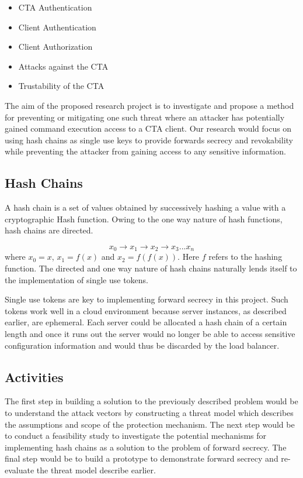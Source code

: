 \documentclass[10pt,conference]{IEEEtran}
\begin{document}
\begin{itemize}
\item CTA Authentication 
\item Client Authentication
\item Client Authorization
\item Attacks against the CTA
\item Trustability of the CTA
\end{itemize}

The aim of the proposed research project is to investigate and propose a method for preventing or 
mitigating one such threat where an attacker has potentially gained command execution access to a 
CTA client. Our research would focus on using hash chains as single use keys to provide 
forwards secrecy\cite{conti_ripp-fs:_2007} and revokability while preventing the attacker from 
gaining access to any sensitive information.

\subsection{Hash Chains}

A hash chain is a set of values obtained by successively hashing a value with a cryptographic Hash 
function. Owing to the one way nature of hash functions, hash chains are directed.

\begin{equation}
x_0 \rightarrow x_1 \rightarrow x_2 \rightarrow x_3 ... x_n
\end{equation}
 where $x_0 = x$, $x_1 = f(x)$ and $x_2 = f(f(x))$. Here $f$ refers to the hashing function. The 
 directed and one way nature of hash chains naturally lends itself to the implementation of single 
 use tokens. 

Single use tokens are key to implementing forward secrecy in this project. Such tokens work well in 
a cloud environment because server instances, as described earlier, are ephemeral. Each server could 
be allocated a hash chain of a certain length and once it runs out the server would no longer be 
able to access sensitive configuration information and would thus be discarded by the load balancer.

\subsection{Activities}

The first step in building a solution to the previously described problem would be to understand the 
attack vectors by constructing a threat model which describes the assumptions and scope of the 
protection mechanism. The next step would be to conduct a feasibility study to investigate the 
potential mechanisms for implementing hash chains as a solution to the problem of forward secrecy. 
The final step would be to build a prototype to demonstrate forward secrecy and re-evaluate the 
threat model describe earlier.
\end{document}
